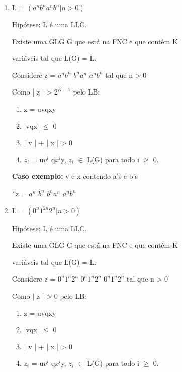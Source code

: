 \newpage

\begin{question}
  
    \begin{enumerate}[label=\textbf{\alph*})]

        \item 
        
        L = $(a^nb^na^nb^n | n > 0 )$

        Hipótese: L é uma LLC.
    
        Existe uma GLG G que está na FNC e que contém K 
    
        variáveis tal que L(G) = L.
    
        Considere z = $a^nb^n$ $b^na^n$ $a^nb^n$ tal que n > 0
    
        Como | z | > $2^{K-1}$ pelo LB:
    
        \begin{enumerate}[label=\textbf{\arabic*})]
            \item z = uvqxy 
            \item |vqx| $\leq$ 0
            \item | v | + | x | > 0
            \item $z_i$ = u$v^i$ q$x^i$y, $z_i$ $\in$ L(G) para todo i $\geq$ 0.
        \end{enumerate}

        \textbf{Caso exemplo:} v e x contendo a's e b's

        *z = $a^n$ $b^n$ $b^na^n$ $a^nb^n$

        \item 
        
        L = $(0^n1^{2n}2^n | n > 0 )$

        Hipótese: L é uma LLC.
    
        Existe uma GLG G que está na FNC e que contém K 
    
        variáveis tal que L(G) = L.
    
        Considere z = $0^n1^n2^n$ $0^n1^n2^n$ $0^n1^n2^n$ tal que n > 0
    
        Como | z | > 0 pelo LB:

        \begin{enumerate}[label=\textbf{\arabic*})]
            \item z = uvqxy 
            \item |vqx| $\leq$ 0
            \item | v | + | x | > 0
            \item  $z_i$ = u$v^i$ q$x^i$y, $z_i$ $\in$ L(G) para todo i $\geq$ 0.
        \end{enumerate}


\end{enumerate}
\end{question}
